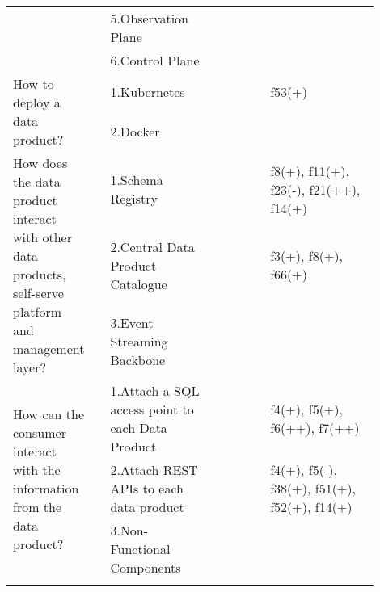 \begin{tabular}{|p{0.12\linewidth}|p{0.015\linewidth}|p{0.3\linewidth}|p{0.15\linewidth}|p{0.31\linewidth}|}
 & \cellcolor{emerald_shape_6}{} & 5.Observation Plane&\cellcolor{emerald_shape_3}{s3, s7, s11, s13, s22, s52} & \\
 & \multirow{-6}{\linewidth}{ \cellcolor{emerald_shape_6}{37}} &6.Control Plane&\cellcolor{emerald_shape_2}{s49, s52} & \\
\multirow{2}{\linewidth}{How to deploy a data product?} &\cellcolor{emerald_shape_3}{} &1.Kubernetes&\cellcolor{emerald_shape_7}{s6, s14, s32, s35, s39, s43, s45, s47} & f53(+)\\
 & \multirow{-2}{\linewidth}{ \cellcolor{emerald_shape_3}{8}} &2.Docker&\cellcolor{emerald_shape_1}{} & \\
\multirow{3}{\linewidth}{How does the data product interact with other data products, self-serve platform and management layer?} &\cellcolor{emerald_shape_6}{} &1.Schema Registry&\cellcolor{emerald_shape_5}{s3, s6, s7, s15, s16, s17, s19, s20, s24, s41, s47, s48, s54, s57} & f8(+), f11(+), f23(-), f21(++), f14(+)\\
 & \cellcolor{emerald_shape_6}{} & 2.Central Data Product Catalogue&\cellcolor{emerald_shape_5}{s5, s9, s15, s20, s23, s31, s32, s39, s40, s42, s45, s46, s47, s48, s49, s53, s54, s55} & f3(+), f8(+), f66(+)\\
 & \multirow{-3}{\linewidth}{ \cellcolor{emerald_shape_6}{37}} &3.Event Streaming Backbone&\cellcolor{emerald_shape_6}{s4, s9, s17, s20, s26, s33, s34, s36, s38, s41, s44, s45, s48, s51, s52, s53, s55, s56, s57} & \\
\multirow{3}{\linewidth}{How can the consumer interact with the information from the data product?} &\cellcolor{emerald_shape_6}{} &1.Attach a SQL access point to each Data Product&\cellcolor{emerald_shape_6}{s2, s3, s5, s7, s10, s13, s14, s15, s16, s27, s30, s31, s32, s36, s37, s38, s39, s43, s46, s48, s49} & f4(+), f5(+), f6(++), f7(++)\\
 & \cellcolor{emerald_shape_6}{} & 2.Attach REST APIs to each data product&\cellcolor{emerald_shape_7}{s2, s3, s5, s6, s7, s8, s9, s15, s17, s18, s20, s30, s32, s33, s34, s36, s37, s38, s39, s40, s41, s45, s49, s52} & f4(+), f5(-), f38(+), f51(+), f52(+), f14(+)\\
 & \multirow{-3}{\linewidth}{ \cellcolor{emerald_shape_6}{33}} &3.Non-Functional Components&\cellcolor{emerald_shape_1}{} & \\
\hline
\multicolumn{5}{l}{\parbox{\textwidth}{\smallskip
}}
\end{tabular}
